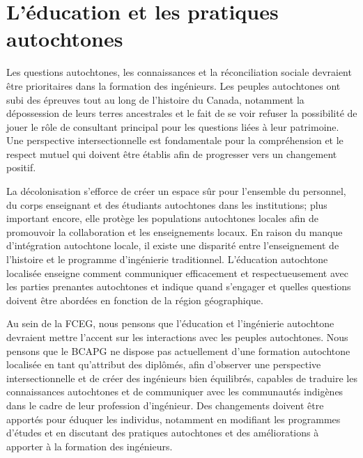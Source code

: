 \section{L'éducation et les pratiques autochtones}\label{leducation-et-les-pratiques-autochtones}




Les questions autochtones, les connaissances et la réconciliation sociale devraient être prioritaires dans la formation des ingénieurs. Les peuples autochtones ont subi des épreuves tout au long de l'histoire du Canada, notamment la dépossession de leurs terres ancestrales et le fait de se voir refuser la possibilité de jouer le rôle de consultant principal pour les questions liées à leur patrimoine. Une perspective intersectionnelle est fondamentale pour la compréhension et le respect mutuel qui doivent être établis afin de progresser vers un changement positif.

La décolonisation s'efforce de créer un espace sûr pour l'ensemble du personnel, du corps enseignant et des étudiants autochtones dans les institutions; plus important encore, elle protège les populations autochtones locales afin de promouvoir la collaboration et les enseignements locaux. En raison du manque d'intégration autochtone locale, il existe une disparité entre l'enseignement de l'histoire et le programme d'ingénierie traditionnel. L'éducation autochtone localisée enseigne comment communiquer efficacement et respectueusement avec les parties prenantes autochtones et indique quand s'engager et quelles questions doivent être abordées en fonction de la région géographique.

Au sein de la FCEG, nous pensons que l'éducation et l'ingénierie autochtone devraient mettre l'accent sur les interactions avec les peuples autochtones. Nous pensons que le BCAPG ne dispose pas actuellement d'une formation autochtone localisée en tant qu'attribut des diplômés, afin d'observer une perspective intersectionnelle et de créer des ingénieurs bien équilibrés, capables de traduire les connaissances autochtones et de communiquer avec les communautés indigènes dans le cadre de leur profession d'ingénieur. Des changements doivent être apportés pour éduquer les individus, notamment en modifiant les programmes d'études et en discutant des pratiques autochtones et des améliorations à apporter à la formation des ingénieurs.

